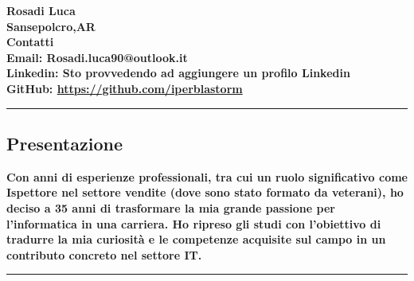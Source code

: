 \documentclass{article}
\newcommand{\spaziocorto}{\\[0.1cm]}
\newcommand{\spaziolungo}{\\[0.3cm]}
\begin{document}
\vspace{-0.2cm}
\begin{flushleft}
	\textbf{\Huge{Rosadi Luca}}
	\spaziocorto
	\textbf{\normalsize{Sansepolcro,\normalsize{AR}}}
	\spaziolungo
	\textbf{\normalsize{Contatti}}
		\spaziocorto
		\textbf{\normalsize{Email: Rosadi.luca90@outlook.it}}
		\spaziocorto
		\textbf{\normalsize{Linkedin: Sto provvedendo ad aggiungere un profilo Linkedin}}
		\spaziocorto
		\textbf{\normalsize{GitHub:} \url{https://github.com/iperblastorm}}
		\spaziocorto
\end{flushleft}

\hrule

\begin{center}
\section*{\large{Presentazione}}
\end{center}
\begin{flushleft}
	\textbf{\normalsize{Con anni di esperienze professionali, tra cui un ruolo significativo come Ispettore nel settore vendite (dove sono stato formato da veterani), ho deciso a 35 anni di trasformare la mia grande passione per l'informatica in una carriera. Ho ripreso gli studi con l'obiettivo di tradurre la mia curiosità e le competenze acquisite sul campo in un contributo concreto nel settore IT.}}
\end{flushleft}

\hrule
\end{document}
